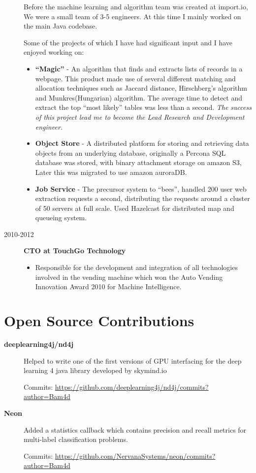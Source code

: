 \documentclass[a4paper]{article}
\def\tightlist{}
\begin{document}
\begin{description}
Before the machine learning and algorithm team was created at import.io,
We were a small team of 3-5 engineers. At this time I mainly worked on
the main Java codebase.

Some of the projects of which I have had significant input and I have
enjoyed working on:

\begin{itemize}
\tightlist
\item
  \textbf{``Magic''} - An algorithm that finds and extracts lists of
  records in a webpage. This product made use of several different
  matching and allocation techniques such as Jaccard distance,
  Hirschberg's algorithm and Munkres(Hungarian) algorithm. The average
  time to detect and extract the top ``most likely'' tables was less
  than a second. \emph{The success of this project lead me to become the
  Lead Research and Development engineer.}
\item
  \textbf{Object Store} - A distributed platform for storing and
  retrieving data objects from an underlying database, originally a
  Percona SQL database was stored, with binary attachment storage on
  amazon S3, Later this was migrated to use amazon auroraDB.
\item
  \textbf{Job Service} - The precursor system to ``bees'', handled 200
  user web extraction requests a second, distributing the requests
  around a cluster of 50 servers at full scale. Used Hazelcast for
  distributed map and queueing system.
\end{itemize}
\item[2010-2012]
\textbf{CTO at TouchGo Technology}

\begin{itemize}
\tightlist
\item
  Responsible for the development and integration of all technologies
  involved in the vending machine which won the Auto Vending Innovation
  Award 2010 for Machine Intelligence.
\end{itemize}
\end{description}

\section{Open Source Contributions}\label{open-source-contributions}

\begin{description}
\tightlist
\item[\textbf{deeplearning4j/nd4j}]
Helped to write one of the first versions of GPU interfacing for the
deep learning 4 java library developed by skymind.io

Commits:
\url{https://github.com/deeplearning4j/nd4j/commits?author=Bam4d}
\item[\textbf{Neon}]
Added a statistics callback which contains precision and recall metrics
for multi-label classification problems.

Commits:
\url{https://github.com/NervanaSystems/neon/commits?author=Bam4d}
\end{description}
\end{document}
